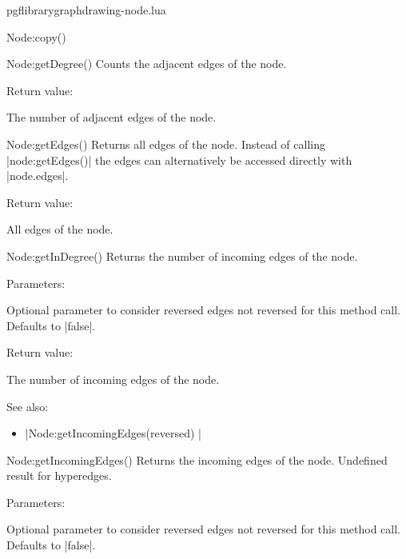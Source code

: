 \begin{filedescription}{pgflibrarygraphdrawing-node.lua}
\begin{luacommand}{{Node:copy}()}
\end{luacommand}
\begin{luacommand}{{Node:getDegree}()}
Counts the adjacent edges of the node. 


Return value:
\begin{parameterdescription} 
  \item[] The number of adjacent edges of the node. 
\end{parameterdescription}


\end{luacommand}
\begin{luacommand}{{Node:getEdges}()}
Returns all edges of the node.  Instead of calling |node:getEdges()| the edges can alternatively be accessed directly with |node.edges|. 


Return value:
\begin{parameterdescription} 
  \item[] All edges of the node. 
\end{parameterdescription}


\end{luacommand}
\begin{luacommand}{{Node:getInDegree}()}
Returns the number of incoming edges of the node. 

Parameters:
\begin{parameterdescription}
	\item[\meta{ignore\_reversed}] Optional parameter to consider reversed edges not reversed for this method call. Defaults to |false|. 
\end{parameterdescription}


Return value:
\begin{parameterdescription} 
  \item[] The number of incoming edges of the node. 
\end{parameterdescription}


See also:
\begin{itemize}
	\item[] |Node:getIncomingEdges(reversed) |
\end{itemize}

\end{luacommand}
\begin{luacommand}{{Node:getIncomingEdges}()}
Returns the incoming edges of the node. Undefined result for hyperedges. 

Parameters:
\begin{parameterdescription}
	\item[\meta{ignore\_reversed}] Optional parameter to consider reversed edges not reversed for this method call. Defaults to |false|. 
\end{parameterdescription}



\end{luacommand}
\end{filedescription}
